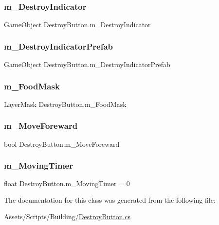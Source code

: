 \subsubsection{\texorpdfstring{m\_DestroyIndicator}{m\_DestroyIndicator}}
{\footnotesize\ttfamily Game\+Object Destroy\+Button.\+m\+\_\+\+Destroy\+Indicator}

\mbox{\label{class_destroy_button_a8bbaf530b36d50aeeda63593aac9c180}} 
\subsubsection{\texorpdfstring{m\_DestroyIndicatorPrefab}{m\_DestroyIndicatorPrefab}}
{\footnotesize\ttfamily Game\+Object Destroy\+Button.\+m\+\_\+\+Destroy\+Indicator\+Prefab}

\mbox{\label{class_destroy_button_ae86fa65d2da82d163307011ea7aa73cb}} 
\subsubsection{\texorpdfstring{m\_FoodMask}{m\_FoodMask}}
{\footnotesize\ttfamily Layer\+Mask Destroy\+Button.\+m\+\_\+\+Food\+Mask}

\mbox{\label{class_destroy_button_a96eb1b0cb43c7cae892139c4f0c910bb}} 
\subsubsection{\texorpdfstring{m\_MoveForeward}{m\_MoveForeward}}
{\footnotesize\ttfamily bool Destroy\+Button.\+m\+\_\+\+Move\+Foreward}

\mbox{\label{class_destroy_button_a35d9b71a601dd973e1a7872c83e99b7f}} 
\subsubsection{\texorpdfstring{m\_MovingTimer}{m\_MovingTimer}}
{\footnotesize\ttfamily float Destroy\+Button.\+m\+\_\+\+Moving\+Timer = 0}



The documentation for this class was generated from the following file\+:\begin{DoxyCompactItemize}
\item 
Assets/\+Scripts/\+Building/\mbox{\hyperlink{_destroy_button_8cs}{Destroy\+Button.\+cs}}\end{DoxyCompactItemize}
